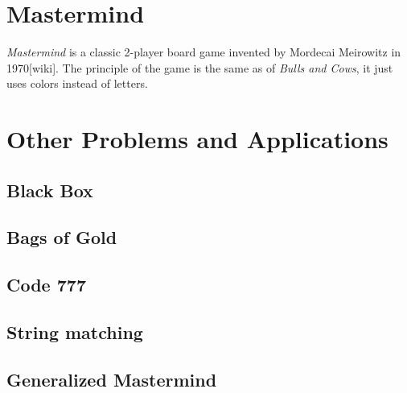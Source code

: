 \section{Mastermind}

\emph{Mastermind} is a classic 2-player board game invented by Mordecai Meirowitz in 1970[wiki].
The principle of the game is the same as of \emph{Bulls and Cows}, it just uses colors instead of letters.

\section{Other Problems and Applications}
\subsection{Black Box}
\subsection{Bags of Gold}

\subsection{Code 777}

\subsection{String matching}

\subsection{Generalized Mastermind}


